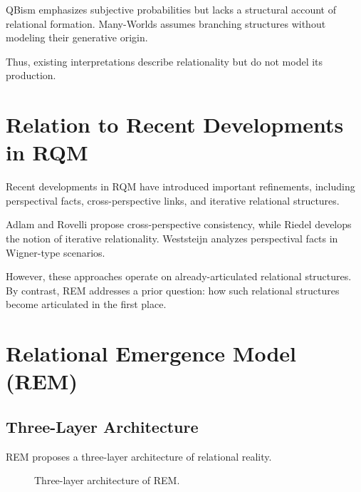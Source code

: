 \documentclass{article}
\begin{document}
QBism emphasizes subjective probabilities but lacks a structural account of relational formation. Many-Worlds assumes branching structures without modeling their generative origin.

Thus, existing interpretations describe relationality but do not model its production.

\section{Relation to Recent Developments in RQM}
Recent developments in RQM have introduced important refinements, including perspectival facts, cross-perspective links, and iterative relational structures.

Adlam and Rovelli propose cross-perspective consistency, while Riedel develops the notion of iterative relationality. Weststeijn analyzes perspectival facts in Wigner-type scenarios.

However, these approaches operate on already-articulated relational structures. By contrast, REM addresses a prior question: how such relational structures become articulated in the first place.

\section{Relational Emergence Model (REM)}
\subsection{Three-Layer Architecture}
REM proposes a three-layer architecture of relational reality.

\begin{figure}[H]
\centering
{}
\caption{Three-layer architecture of REM.}
\end{figure}
\end{document}
